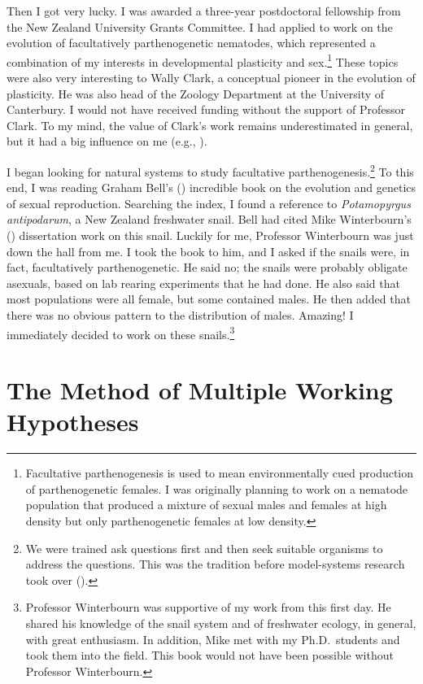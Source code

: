 \documentclass[
  letterpaper,
]{book}
\begin{document}
Then I got very lucky. I was awarded a three-year postdoctoral
fellowship from the New Zealand University Grants Committee. I had
applied to work on the evolution of facultatively parthenogenetic
nematodes, which represented a combination of my interests in
developmental plasticity and sex.\footnote{Facultative parthenogenesis
  is used to mean environmentally cued production of parthenogenetic
  females. I was originally planning to work on a nematode population
  that produced a mixture of sexual males and females at high density
  but only parthenogenetic females at low density.} These topics were
also very interesting to Wally Clark, a conceptual pioneer in the
evolution of plasticity. He was also head of the Zoology Department at
the University of Canterbury. I would not have received funding without
the support of Professor Clark. To my mind, the value of Clark's work
remains underestimated in general, but it had a big influence on me
(e.g., ).

I began looking for natural systems to study facultative
parthenogenesis.\footnote{We were trained ask questions first and then
  seek suitable organisms to address the questions. This was the
  tradition before model-systems research took over
  ().} To this end, I was
reading Graham Bell's () incredible book
on the evolution and genetics of sexual reproduction. Searching the
index, I found a reference to \emph{Potamopyrgus antipodarum}, a New
Zealand freshwater snail. Bell had cited Mike Winterbourn's
() dissertation work on this snail.
Luckily for me, Professor Winterbourn was just down the hall from me. I
took the book to him, and I asked if the snails were, in fact,
facultatively parthenogenetic. He said no; the snails were probably
obligate asexuals, based on lab rearing experiments that he had done. He
also said that most populations were all female, but some contained
males. He then added that there was no obvious pattern to the
distribution of males. Amazing! I immediately decided to work on these
snails.\footnote{Professor Winterbourn was supportive of my work from
  this first day. He shared his knowledge of the snail system and of
  freshwater ecology, in general, with great enthusiasm. In addition,
  Mike met with my Ph.D.~students and took them into the field. This
  book would not have been possible without Professor Winterbourn.}

\section{The Method of Multiple Working
Hypotheses}\label{the-method-of-multiple-working-hypotheses}
\end{document}
